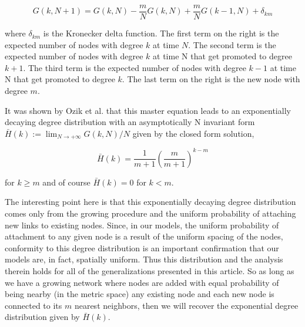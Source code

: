\documentclass[aps,pre,reprint,superscriptaddress,amsmath,amssymb]{revtex4-1}
\begin{document}
\[G(k,N+1) = G(k,N) - \frac{m}{N}G(k,N) + \frac{m}{N}G(k-1,N) + \delta_{km}\]

where $\delta_{km}$ is the Kronecker delta function.
The first term on the right is the expected number of nodes with degree $k$ at time $N$.
The second term is the expected number of nodes with degree $k$ at time N that get promoted to degree $k+1$.
The third term is the expected number of nodes with degree $k-1$ at time N that get promoted to degree $k$.
The last term on the right is the new node with degree $m$.

It was shown by Ozik et al. \cite{ozik2004} that this master equation leads to an exponentially decaying degree distribution with an asymptotically N invariant form $\bar{H}(k) := \lim_{N \to +\infty} G(k,N)/N$ given by the closed form solution,

\[\bar{H}(k) = \frac{1}{m+1}\left(\frac{m}{m+1}\right)^{k-m}\]

for $k \geq m$ and of course $\bar{H}(k) = 0$ for $k < m$.

The interesting point here is that this exponentially decaying degree distribution comes only from the growing procedure and the uniform probability of attaching new links to existing nodes.  Since, in our models, the uniform probability of attachment to any given node is a result of the uniform spacing of the nodes, conformity to this degree distribution is an important confirmation that our models are, in fact, spatially uniform.
Thus this distribution and the analysis therein holds for all of the generalizations presented in this article. 
So as long as we have a growing network where nodes are added with equal probability of being nearby (in the metric space) any existing node and each new node is connected to its $m$ nearest neighbors, then we will recover the exponential degree distribution given by $\bar{H}(k)$.

\end{document}
